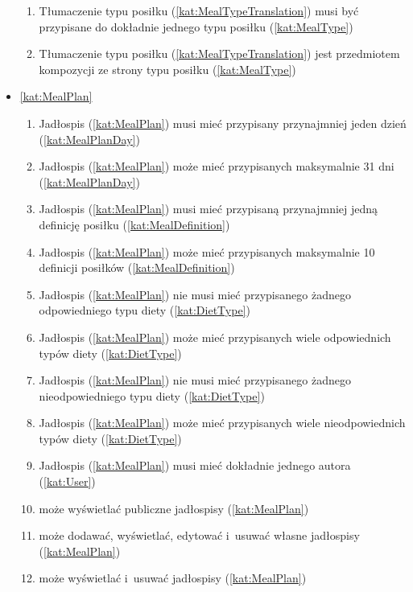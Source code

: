 \begin{itemize}[label={\textbf{Reguły dla}}, wide, labelwidth=!, labelindent=0pt]
\begin{enumerate}[label={\textbf{REG/\protect\threedigits{\arabic{enumi}}}}, wide, labelwidth=!, align=left, leftmargin=3cm, resume]
        \item Tłumaczenie typu posiłku (\ref{kat:MealTypeTranslation}) musi być przypisane do dokładnie jednego typu posiłku (\ref{kat:MealType})
        \item Tłumaczenie typu posiłku (\ref{kat:MealTypeTranslation}) jest przedmiotem kompozycji ze strony typu posiłku (\ref{kat:MealType})
    \end{enumerate}
    \item\ref{kat:MealPlan}
    \begin{enumerate}[label={\textbf{REG/\protect\threedigits{\arabic{enumi}}}}, wide, labelwidth=!, align=left, leftmargin=3cm, resume]
        \item Jadłospis (\ref{kat:MealPlan}) musi mieć przypisany przynajmniej jeden dzień (\ref{kat:MealPlanDay})
        \item Jadłospis (\ref{kat:MealPlan}) może mieć przypisanych maksymalnie 31 dni (\ref{kat:MealPlanDay})
        \item Jadłospis (\ref{kat:MealPlan}) musi mieć przypisaną przynajmniej jedną definicję posiłku (\ref{kat:MealDefinition})
        \item Jadłospis (\ref{kat:MealPlan}) może mieć przypisanych maksymalnie 10 definicji posiłków (\ref{kat:MealDefinition})
        \item Jadłospis (\ref{kat:MealPlan}) nie musi mieć przypisanego żadnego odpowiedniego typu diety (\ref{kat:DietType})
        \item Jadłospis (\ref{kat:MealPlan}) może mieć przypisanych wiele odpowiednich typów diety (\ref{kat:DietType})
        \item Jadłospis (\ref{kat:MealPlan}) nie musi mieć przypisanego żadnego nieodpowiedniego typu diety (\ref{kat:DietType})
        \item Jadłospis (\ref{kat:MealPlan}) może mieć przypisanych wiele nieodpowiednich typów diety (\ref{kat:DietType})
        \item Jadłospis (\ref{kat:MealPlan}) musi mieć dokładnie jednego autora (\ref{kat:User})
        \item {} może wyświetlać publiczne jadłospisy (\ref{kat:MealPlan})
        \item {} może dodawać, wyświetlać, edytować i~usuwać własne jadłospisy (\ref{kat:MealPlan})
        \item {} może wyświetlać i~usuwać jadłospisy (\ref{kat:MealPlan})
    \end{enumerate}

\end{itemize}
